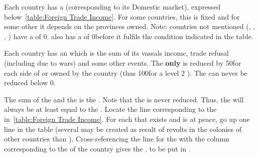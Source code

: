 \aparag Each country has a  (corresponding to
its Domestic market), expressed below~\ref{table:Foreign Trade
  Income}.
\bparag For some countries, this is fixed and for some other it depends
on the provinces owned.
\bparag Note: countries not mentioned (\POL, \POR, \PRU, \VEN) have a
 of 0\ducats. \RUS also has a  of 0\ducats before it fulfils the condition indicated
in the table.

\aparag Each country has an  which is the sum
of its vassals income, trade refusal (including due to wars) and some
other events.
\bparag The  \textbf{only} is reduced by
50\ducats for each side of  or  \MNU owned by the
country (thus 100\ducats for a level 2 \MNU).
\bparag The  can never be reduced below 0.

\aparag The sum of the  and the  is the .
\bparag Note that the  is never
reduced. Thus, the  will always be at least equal
to the .
\bparag Locate the line corresponding to the 
in~\ref{table:Foreign Trade Income}.
\bparag For each  that exists and is at peace, go up one
line in the table (several  may be created as result of
revolts in the colonies of other countries than \ANG).
\bparag Cross-referencing the line for the  with
the column corresponding to the \FTI of the country gives the
, to be put in .


